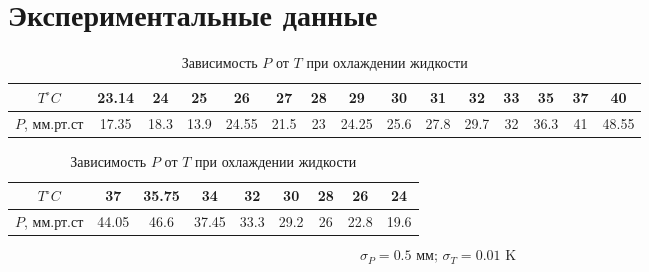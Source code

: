 \section*{Экспериментальные данные}

\begin{table}[h!]
    \centering
    \begin{tabular}{|c|c|c|c|c|c|c|c|c|c|c|c|c|c|c|}
        \hline
        $T^\circ C$ & 23.14 & 24 & 25 & 26 & 27 & 28 & 29 & 30 & 31 & 32 & 33 & 35 & 37 & 40 \\\hline
        $P$, мм.рт.ст & 17.35 & 18.3 & 13.9 & 24.55 & 21.5  & 23 & 24.25 & 25.6 & 27.8 &
        29.7 & 32 & 36.3 &  41 & 48.55\\\hline 
    \end{tabular}
    \caption{Зависимость $P$ от $T$ при нагревании жидкости}
    \vfill 
    \begin{tabular}{|c|c|c|c|c|c|c|c|c|}
        \hline
        $T^\circ C$ & 37 & 35.75 & 34 & 32 & 30 & 28 & 26 & 24\\\hline
        $P$, мм.рт.ст & 44.05 & 46.6 & 37.45 & 33.3 & 29.2 & 26 & 22.8 & 19.6\\\hline
    \end{tabular}
    \caption{Зависимость $P$ от $T$ при охлаждении жидкости}
\end{table}
$$\sigma_{P} = 0.5\text{ мм; }\sigma_{T} = 0.01 \text{ K}$$\\\indent

